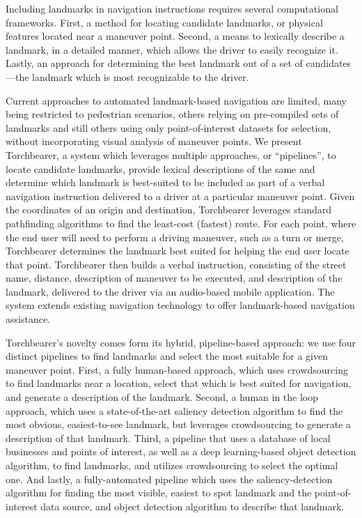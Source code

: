 Including landmarks in navigation instructions requires several computational frameworks. First, a method for locating candidate landmarks, or physical features located near a maneuver point. Second, a means to lexically describe a landmark, in a detailed manner, which allows the driver to easily recognize it. Lastly, an approach for determining the best landmark out of a set of candidates---the landmark which is most recognizable to the driver. 

Current approaches to automated landmark-based navigation are limited, many being restricted to pedestrian scenarios, others relying on pre-compiled sets of landmarks and still others using only point-of-interest datasets for selection, without incorporating visual analysis of maneuver points. We present Torchbearer, a system which leverages multiple approaches, or “pipelines”, to locate candidate landmarks, provide lexical descriptions of the same and determine which landmark is best-suited to be included as part of a verbal navigation instruction delivered to a driver at a particular maneuver point. Given the coordinates of an origin and destination, Torchbearer leverages standard pathfinding algorithms to find the least-cost (fastest) route. For each point, where the end user will need to perform a driving maneuver, such as a turn or merge, Torchbearer determines the landmark best suited for helping the end user locate that point. Torchbearer then builds a verbal instruction, consisting of the street name, distance, description of maneuver to be executed, and description of the landmark, delivered to the driver via an audio-based mobile application. The system extends existing navigation technology to offer landmark-based navigation assistance.
 
Torchbearer's novelty comes form its hybrid, pipeline-based approach: we use four distinct pipelines to find landmarks and select the most suitable for a given maneuver point. First, a fully human-based approach, which uses crowdsourcing to find landmarks near a location, select that which is best suited for navigation, and generate a description of the landmark. Second, a human in the loop approach, which uses a state-of-the-art saliency detection algorithm to find the most obvious, easiest-to-see landmark, but leverages crowdsourcing to generate a description of that landmark. Third, a pipeline that uses a database of local businesses and points of interest, as well as a deep learning-based object detection algorithm, to find landmarks, and utilizes crowdsourcing to select the optimal one. And lastly, a fully-automated pipeline which uses the saliency-detection algorithm for finding the most visible, easiest to spot landmark and the point-of-interest data source, and object detection algorithm to describe that landmark.

